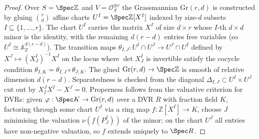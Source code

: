 \begin{proof}\leanok
  Over \(S = \Spec \mathbb{Z}\) and \(V = \mathcal{O}_S^{\oplus r}\) the
  Grassmannian \(\mathrm{Gr}(r, d)\) is constructed by gluing
  \(\binom{r}{d}\) affine charts \(U^I = \Spec\mathbb{Z}[X^I]\) indexed by
  size-\(d\) subsets \(I \subseteq \{1, \dots, r\}\). The chart \(U^I\)
  carries the matrix \(X^I\) of size \(d \times r\) whose \(I\)-th \(d \times d\)
  minor is the identity, with the remaining \(d(r-d)\) entries free
  variables (so \(U^I \cong \mathbb{A}^{d(r-d)}_{\mathbb{Z}}\)). The
  transition maps \(\theta_{I,J} : U^I \cap U^J \to U^J \cap U^I\) defined
  by \(X^J \mapsto (X^I_J)^{-1} X^I\) on the locus where \(\det X^I_J\) is
  invertible satisfy the cocycle condition
  \(\theta_{I,K} = \theta_{I,J} \circ \theta_{J,K}\). The glued
  \(\mathrm{Gr}(r,d) \to \Spec\mathbb{Z}\) is smooth of relative dimension
  \(d(r-d)\). Separatedness is checked from the diagonal
  \(\Delta_{I,J} \subset U^I \times U^J\) cut out by \(X^J_I X^I - X^J = 0\).
  Properness follows from the valuative criterion for DVRs: given
  \(\varphi : \Spec K \to \mathrm{Gr}(r,d)\) over a DVR \(R\) with fraction
  field \(K\), factoring through some chart \(U^I\) via a ring map
  \(f : \mathbb{Z}[X^I] \to K\), choose \(J\) minimising the valuation
  \(\nu(f(P^I_J))\) of the minor; on the chart \(U^J\) all entries have
  non-negative valuation, so \(f\) extends uniquely to \(\Spec R\).


\end{proof}
